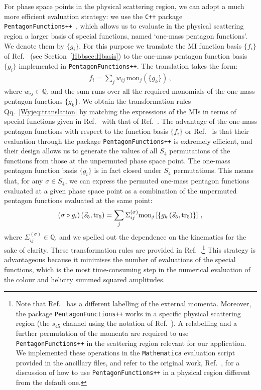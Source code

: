 \documentclass[main.tex]{subfiles}
\begin{document}
For phase space points in the physical scattering region, we can adopt a much more efficient evaluation strategy: we use the \texttt{C++} package \texttt{PentagonFunctions++}~\cite{Chicherin:2021dyp}, which allows us to evaluate in the physical scattering region a larger basis of special functions, named `one-mass pentagon functions'. We denote them by $\{g_i\}$.
For this purpose we translate the MI function basis $\{f_i\}$ of Ref.~\cite{Badger:2021nhg} (see Section~\ref{Hbbsec:Hbasis}) to the one-mass pentagon function basis $\{g_i\}$ implemented in \texttt{PentagonFunctions++}. The translation takes the form:
\begin{align} \label{Wyjeq:translation}
f_i = \sum_{j} w_{ij} \, \text{mon}_j \left(\{g_k\} \right) \,,
\end{align}
where $w_{ij} \in \mathbb{Q}$, and the sum runs over all the required monomials of the one-mass pentagon functions $\{g_k\}$. We obtain the transformation rules Qq.~\ref{Wyjeq:translation} by matching the expressions of the MIs in terms of special functions given in Ref.~\cite{Badger:2021nhg} with that of Ref.~\cite{Chicherin:2021dyp}. The advantage of the one-mass pentagon functions with respect to the function basis $\{f_i\}$ or Ref.~\cite{Badger:2021nhg} is that their evaluation through the package \texttt{PentagonFunctions++} is extremely efficient, and their design allows us to generate the values of all $S_4$ permutations of the functions from those at the unpermuted phase space point. 
The one-mass pentagon function basis $\{g_i\}$ is in fact closed under $S_4$ permutations. This means that, for any $\sigma \in S_4$, we can express the permuted one-mass pentagon functions evaluated at a given phase space point as a combination of the unpermuted pentagon functions evaluated at the same point:
\begin{align} \label{Wyjeq:permf}
\left(\sigma \circ g_i\right)(\vec{s}_5, \operatorname{\rm tr}_5) = \sum_j \Sigma_{ij}^{(\sigma)} \text{mon}_j \left[ \{ g_k\left(\vec{s}_5, \operatorname{\rm tr}_5 \right) \} \right] \,,
\end{align}
where $\Sigma_{ij}^{(\sigma)} \in \mathbb{Q}$, and we spelled out the dependence on the kinematics for the sake of clarity. These transformation rules are provided in Ref.~\cite{Chicherin:2021dyp}.\footnote{Note that Ref.~\cite{Chicherin:2021dyp} has a different labelling of the external momenta. Moreover, the package \texttt{PentagonFunctions++} works in a specific physical scattering region (the $s_{45}$ channel using the notation of Ref.~\cite{Chicherin:2021dyp}). A relabelling and a further permutation of the momenta are required to use \texttt{PentagonFunctions++} in the scattering region relevant for our application. We implemented these operations in the \texttt{Mathematica} evaluation script provided in the ancillary files, and refer to the original work, Ref.~\cite{Chicherin:2021dyp}, for a discussion of how to use \texttt{PentagonFunctions++} in a physical region different from the default one.} This strategy is advantageous because it minimises the number of evaluations of the special functions, which is the most time-consuming step in the  numerical evaluation of the colour and helicity summed squared amplitudes.
\end{document}
